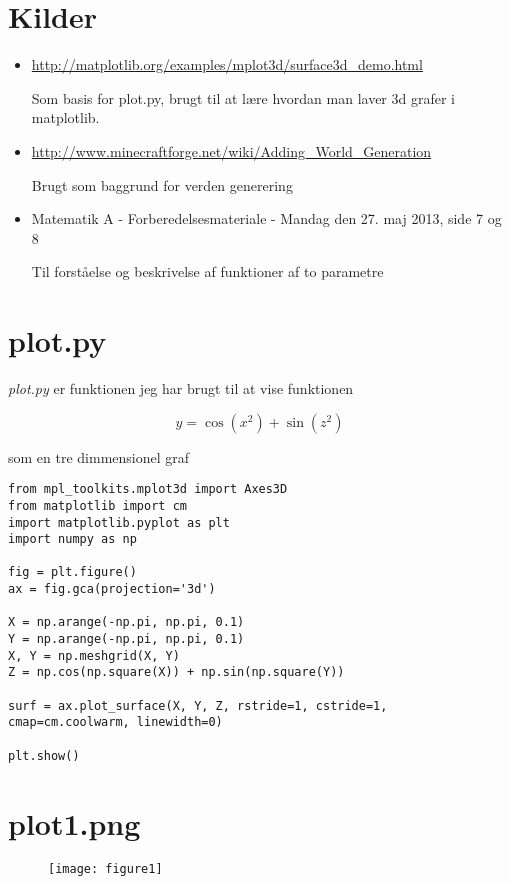 \documentclass[a4paper,12pt]{report}
\begin{document}
	\chapter{Kilder}
		\begin{itemize}
			\item \url{http://matplotlib.org/examples/mplot3d/surface3d_demo.html}
			
			Som basis for plot.py, brugt til at l\ae re hvordan man laver 3d grafer i matplotlib.

			\item \url{http://www.minecraftforge.net/wiki/Adding_World_Generation}

			Brugt som baggrund for verden generering

			\item Matematik A - Forberedelsesmateriale - Mandag den 27. maj 2013, side 7 og 8
			
			Til forst\aa else og beskrivelse af funktioner af to parametre
		\end{itemize}
	\appendix
		\chapter{plot.py}
		\label{appendixA}
			\emph{plot.py} er funktionen jeg har brugt til at vise funktionen

			\[y = \cos (x^2) + \sin (z^2)\]

			som en tre dimmensionel graf

\begin{lstlisting}[label=plot.pyl,caption=plot.py]
from mpl_toolkits.mplot3d import Axes3D
from matplotlib import cm
import matplotlib.pyplot as plt
import numpy as np

fig = plt.figure()
ax = fig.gca(projection='3d')

X = np.arange(-np.pi, np.pi, 0.1)
Y = np.arange(-np.pi, np.pi, 0.1)
X, Y = np.meshgrid(X, Y)
Z = np.cos(np.square(X)) + np.sin(np.square(Y))

surf = ax.plot_surface(X, Y, Z, rstride=1, cstride=1, cmap=cm.coolwarm, linewidth=0)

plt.show()
\end{lstlisting}
		\chapter{plot1.png}
		\label{appendixB}
			\begin{figure}
				\begin{center}
				\texttt{[image: figure1]}
				\end{center}
			\end{figure}
\end{document}

